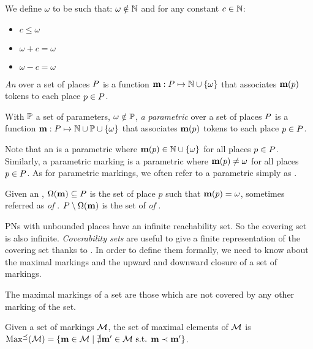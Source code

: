 \begin{defi}[\omark]
  We define $\omega$ to be such that:
  $\omega \notin \mathbb{N}$
  and for any constant $c \in \mathbb{N}$:
  \begin{itemize}
    \item $c \leq \omega$
    \item $\omega + c = \omega$
    \item $\omega - c = \omega$
  \end{itemize}

  \emph{An \omark} \mar over a set of places $P$ is a function $\mathbf{m} : P \mapsto \mathbb{N} \cup \{\omega\}$ that associates $\mathbf{m}(p)$ tokens to each place $p \in P$.

  With $\mathbb{P}$ a set of parameters, $\omega \notin \mathbb{P}$,
  \emph{a parametric \omark} \mar over a set of places $P$ is a function $\mathbf{m} : P \mapsto \mathbb{N} \cup \mathbb{P} \cup \{\omega\}$ that associates $\mathbf{m}(p)$ tokens to each place $p \in P$.
\end{defi}

Note that an \omark \mar is a parametric \omark where $\mathbf{m}(p) \in \mathbb{N} \cup \{\omega\}$ for all places $p \in P$.
Similarly, a parametric marking \mar is a parametric \omark where $\mathbf{m}(p) \neq \omega$ for all places $p \in P$.
As for parametric markings, we often refer to a parametric \omark simply as \omark.

Given an \omark \mar, $\operatorname{\Omega}(\mathbf{m}) \subseteq P$ is the set of place $p$ such that $\mathbf{m}(p) = \omega$, sometimes referred as \emph{\oplaces of \mar}. $P \setminus \operatorname{\Omega}(\mathbf{m})$ is the set of \emph{\noplaces of \mar}.

\acp{PN} with unbounded places have an infinite reachability set.
So the covering set is also infinite.
\emph{Coverability sets} are useful to give a finite representation of the covering set thanks to \omarks.
In order to define them formally, we need to know about the maximal markings and the upward and downward closure of a set of markings.

The maximal markings of a set are those which are not covered by any other marking of the set.
\begin{defi}
  Given a set of markings $\mathcal{M}$, the set of maximal elements of $\mathcal{M}$ is
  $\operatorname{Max^\preceq}(\mathcal{M}) = \left\{ \mathbf{m} \in \mathcal{M} \mid \nexists \mathbf{m}' \in \mathcal{M} \text{ s.t. } \mathbf{m} \prec \mathbf{m}' \right\}$.
\end{defi}


